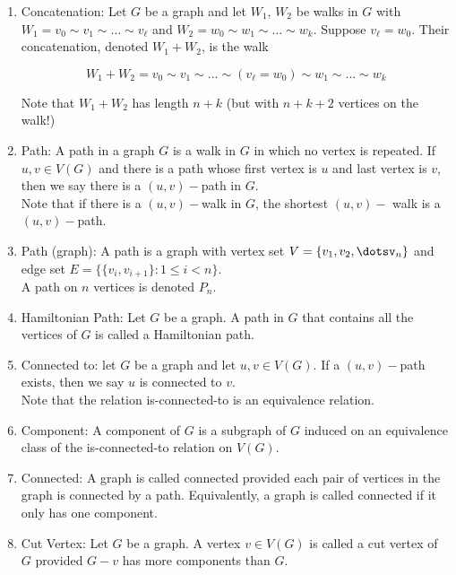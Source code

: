 \documentclass{article}
\begin{document}
\begin{enumerate}
    \item Concatenation: Let $G$ be a graph and let $W_1$, $W_2$ be walks in $G$ with $W_1=v_0\sim v_1\sim \dots\sim v_\ell$ and $W_2=w_0\sim w_1\sim \dots\sim w_k$.
    Suppose $v_\ell=w_0$.
    Their concatenation, denoted $W_1+W_2$, is the walk

    \[W_1+W_2=v_0\sim v_1\sim\dots\sim(v_\ell=w_0)\sim w_1\sim\dots\sim w_k\]

    Note that $W_1+W_2$ has length $n+k$ (but with $n+k+2$ vertices on the walk!)

    \item Path: A path in a graph $G$ is a walk in $G$ in which no vertex is repeated.
    If $u,v\in V(G)$ and there is a path whose first vertex is $u$ and last vertex is $v$, then we say there is a $(u,v)-$path in $G$. \\

    Note that if there is a $(u,v)-$walk in $G$, the shortest $(u,v)-$ walk is a $(u,v)-$path.

    \item Path (graph): A path is a graph with vertex set $V=\{v_1,v_2,\dotsv_n\}$ and edge set $E=\{\{v_i,v_{i+1}\}:1\leq i<n\}$.\\

    A path on $n$ vertices is denoted $P_n$.

    \item Hamiltonian Path: Let $G$ be a graph.
    A path in $G$ that contains all the vertices of $G$ is called a Hamiltonian path.

    \item Connected to: let $G$ be a graph and let $u,v\in V(G)$.
    If a $(u,v)-$path exists, then we say $u$ is connected to $v$.\\

    Note that the relation is-connected-to is an equivalence relation.

    \item Component: A component of $G$ is a subgraph of $G$ induced on an equivalence class of the is-connected-to relation on $V(G)$.

    \item Connected: A graph is called connected provided each pair of vertices in the graph is connected by a path.
    Equivalently, a graph is called connected if it only has one component.

    \item Cut Vertex: Let $G$ be a graph.
    A vertex $v\in V(G)$ is called a cut vertex of $G$ provided $G-v$ has more components than $G$.


\end{enumerate}
\end{document}
